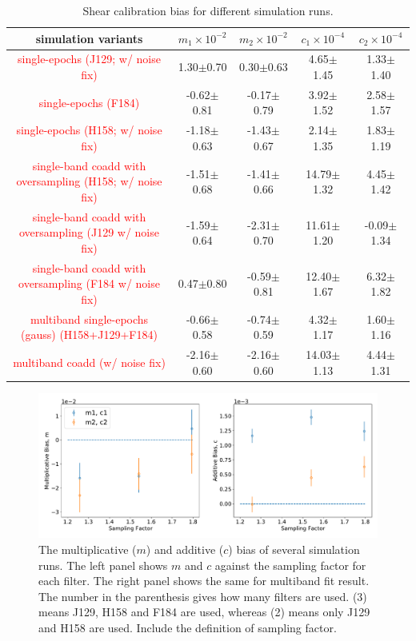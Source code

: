 \documentclass[fleqn,usenatbib]{mnras}
\begin{document}
\begin{table}
	\centering
	\label{tab:bias_summary}
	\begin{tabular}[scale=1.4]{ c|c|c|c|c } 
		\hline
		simulation variants & $m_{1}\times10^{-2}$ & $m_{2}\times10^{-2}$ & $c_{1}\times10^{-4}$ & $c_{2}\times10^{-4}$\\
		\hline
		\textcolor{red}{single-epochs (J129; w/ noise fix)} & 1.30$\pm$0.70 & 0.30$\pm$0.63 & 4.65$\pm$1.45 & 1.33$\pm$1.40\\
		\textcolor{red}{single-epochs (F184)} & -0.62$\pm$0.81 & -0.17$\pm$0.79 & 3.92$\pm$1.52 & 2.58$\pm$1.57\\
		\textcolor{red}{single-epochs (H158; w/ noise fix)} & -1.18$\pm$0.63 & -1.43$\pm$0.67 & 2.14$\pm$1.35 & 1.83$\pm$1.19\\
		\hline
		\textcolor{red}{single-band coadd with oversampling (H158; w/ noise fix)} & -1.51$\pm$0.68 & -1.41$\pm$0.66 & 14.79$\pm$1.32 & 4.45$\pm$1.42\\
		\textcolor{red}{single-band coadd with oversampling (J129 w/ noise fix)} & -1.59$\pm$0.64 & -2.31$\pm$0.70 & 11.61$\pm$1.20 & -0.09$\pm$1.34\\
		\textcolor{red}{single-band coadd with oversampling (F184 w/ noise fix)} & 0.47$\pm$0.80 & -0.59$\pm$0.81 & 12.40$\pm$1.67 & 6.32$\pm$1.82\\
		\hline
		\textcolor{red}{multiband single-epochs (gauss) (H158+J129+F184)} & -0.66$\pm$0.58 & -0.74$\pm$0.59 & 4.32$\pm$1.17 & 1.60$\pm$1.16 \\
		\textcolor{red}{multiband coadd (w/ noise fix)} & -2.16$\pm$0.60 & -2.16$\pm$0.60 & 14.03$\pm$1.13 & 4.44$\pm$1.31\\
		
		\hline
	\end{tabular}
	\caption{Shear calibration bias for different simulation runs.}
	\label{tab:result}
\end{table}

\begin{figure}
	\includegraphics[scale=0.5]{final_result.pdf}
    \caption{The multiplicative ($m$) and additive ($c$) bias of several simulation runs. The left panel shows $m$ and $c$ against the sampling factor for each filter. The right panel shows the same for multiband fit result. The number in the parenthesis gives how many filters are used. (3) means J129, H158 and F184 are used, whereas (2) means only J129 and H158 are used. Include the definition of sampling factor. }
    \label{fig:final_result}
\end{figure}
\end{document}
